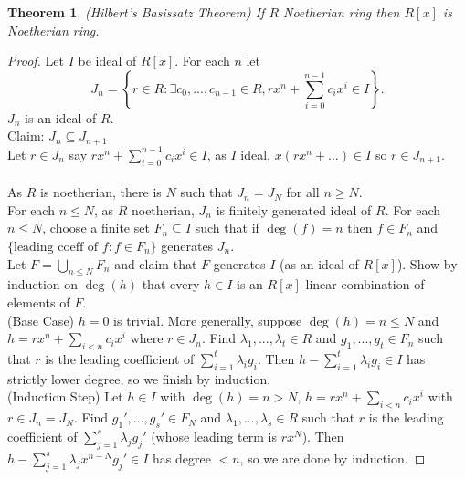 \documentclass[a4paper,12pt]{article}
\newtheorem{thm}{Theorem}[section]
\begin{document}
\begin{thm}
    (Hilbert's Basissatz Theorem) If $R$ Noetherian ring then $R[x]$ is Noetherian ring. 
\end{thm}
\begin{proof}
    Let $I$ be ideal of $R[x]$. For each $n$ let \[
        J_n= \left \{r\in R: \exists c_0,...,c_{n-1}\in R, rx^n+\sum_{i=0}^{n-1}c_ix^i\in I\right \}
    .\]  
    $J_n$ is an ideal of $R$. \\
    Claim: $J_n\subseteq J_{n+1}$\\
    Let $r\in J_n$ say $rx^n+\sum_{i=0}^{n-1}c_ix^i\in I$, as $I$ ideal, $x(rx^n+...)\in I$ so $r\in J_{n+1}$. \\\\
    As $R$ is noetherian, there is $N$ such that $J_n=J_N$ for all $n\geq N$. \\
    For each $n\leq N$, as $R$ noetherian, $J_n$ is finitely generated ideal of $R$. For each $n\leq N$, choose a finite set $F_n\subseteq I$ such that if $\deg(f)=n$ then $f\in F_n$ and $ \{ \text{leading coeff of $f$}: f\in F_n\}$ generates $J_n$. \\
    Let $F=\bigcup_{n\leq N}F_n$ and claim that $F$ generates $I$ (as an ideal of $R[x]$). Show by induction on $\deg(h)$ that every $h\in I$ is an $R[x]$-linear combination of elements of $F$. \\
    (Base Case) $h=0$ is trivial. More generally, suppose $\deg(h)=n\leq N$ and $h=rx^n+\sum_{i<n}c_ix^i$ where $r\in J_n$. Find $\lambda_1,...,\lambda_t\in R$ and $g_1,...,g_t\in F_n$ such that $r$ is the leading coefficient of $\sum_{i=1}^t \lambda_i g_i$. Then $h-\sum_{i=1}^t\lambda_i g_i\in I$ has strictly lower degree, so we finish by induction. \\
    (Induction Step) Let $h\in I$ with $\deg(h)=n>N$, $h=rx^n+\sum_{i<n}c_ix^i$ with $r\in J_n=J_N$. Find $g_1',...,g_s'\in F_N$ and $\lambda_1,...,\lambda_s\in R$ such that $r$ is the leading coefficient of $\sum_{j=1}^s \lambda_j g_j'$ (whose leading term is $rx^N$). Then $h-\sum_{j=1}^s\lambda_j x^{n-N}g_j'\in I$ has degree $<n$, so we are done by induction.
\end{proof}
\newpage
\end{document}
